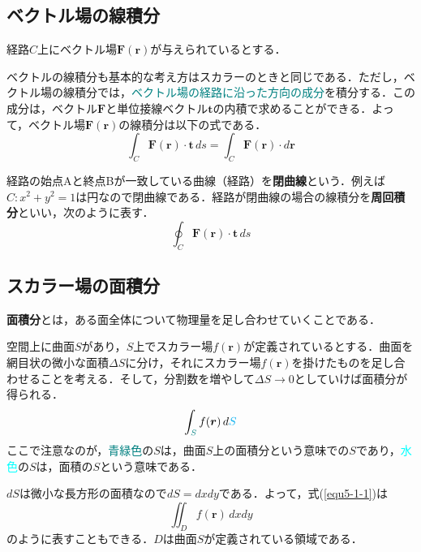 \subsection{ベクトル場の線積分}

経路$C$上にベクトル場$\bm{F}(\bm{r})$が与えられているとする．

ベクトルの線積分も基本的な考え方はスカラーのときと同じである．ただし，ベクトル場の線積分では，\textcolor{teal}{ベクトル場の経路に沿った方向の成分}を積分する．この成分は，ベクトル$\bm{F}$と単位接線ベクトル$\bm{t}$の内積で求めることができる．よって，ベクトル場$\bm{F}(\bm{r})$の線積分は以下の式である．
\begin{equation}
	\int_{C} \bm{F}(\bm{r}) \cdot \bm{t}\,ds = \int_{C} \bm{F}(\bm{r}) \cdot d\bm{r}
\end{equation}

経路の始点Aと終点Bが一致している曲線（経路）を\textbf{閉曲線}という．例えば$C: x^2 + y^2 = 1$は円なので閉曲線である．経路が閉曲線の場合の線積分を\textbf{周回積分}といい，次のように表す．
\begin{equation}
	\oint_{C} \bm{F}(\bm{r}) \cdot \bm{t}\,ds
\end{equation}



\subsection{スカラー場の面積分}

\textbf{面積分}とは，ある面全体について物理量を足し合わせていくことである．

空間上に曲面$S$があり，$S$上でスカラー場$f(\bm{r})$が定義されているとする．曲面を網目状の微小な面積$\varDelta S$に分け，それにスカラー場$f(\bm{r})$を掛けたものを足し合わせることを考える．そして，分割数を増やして$\varDelta S \to 0$としていけば面積分が得られる．
\begin{equation}
	\int_{\color{teal}S} f(\bm{r})\,d{\color{cyan}S} \label{equ5-1-1}
\end{equation}
ここで注意なのが，\textcolor{teal}{青緑色}の$S$は，曲面$S$上の面積分という意味での$S$であり，\textcolor{cyan}{水色}の$S$は，面積の$S$という意味である．

$dS$は微小な長方形の面積なので$dS = dxdy$である．よって，式(\ref{equ5-1-1})は
\begin{equation}
	\iint_{D} f(\bm{r})\,dxdy
\end{equation}
のように表すこともできる．$D$は曲面$S$が定義されている領域である．



